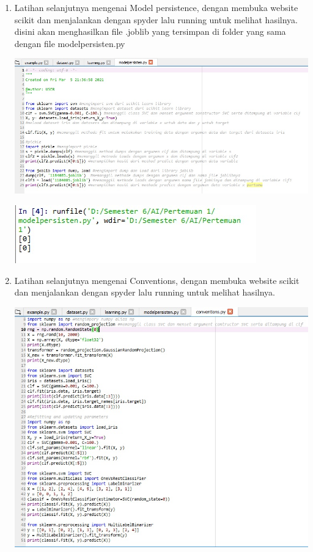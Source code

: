 \begin{enumerate}
\begin{center}
    \end{center}
    \item Latihan selanjutnya mengenai Model persistence, dengan membuka website scikit dan menjalankan dengan spyder lalu running untuk melihat hasilnya. disini akan menghasilkan file .joblib yang tersimpan di folder yang sama dengan file modelpersisten.py
    \begin{center}
    \includegraphics[scale=0.5]{figures/1184085/chapter1/9.jpg}
    \end{center}
    \begin{center}
    \includegraphics[scale=0.75]{figures/1184085/chapter1/10.jpg}
    \end{center}
    \item Latihan selanjutnya mengenai Conventions, dengan membuka website scikit dan menjalankan dengan spyder lalu running untuk melihat hasilnya.
    \begin{center}
    \includegraphics[width=.75\textwidth]{figures/1184085/chapter1/11.jpg}

\end{center}
\end{enumerate}
